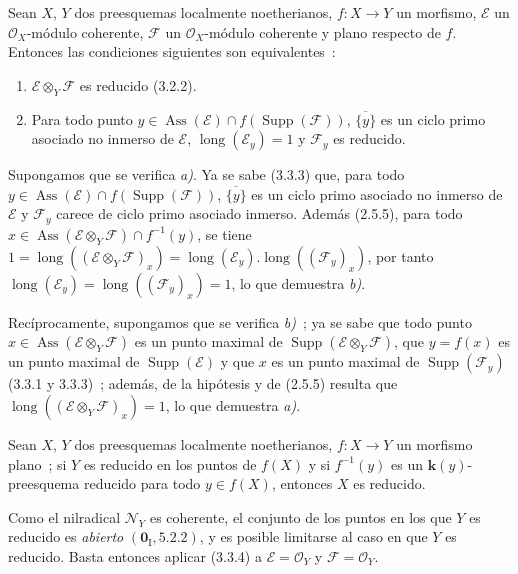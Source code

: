 \begin{proposition}[3.3.4]
\label{IV.2.3.3.4-fr}
Sean $X$, $Y$ dos preesquemas localmente noetherianos, $f:X\to Y$ un
morfismo, $\mathcal E$ un $\mathcal O_X$-módulo coherente, $\mathcal F$ un
$\mathcal O_X$-módulo coherente y plano respecto de $f$. Entonces las
condiciones siguientes son equivalentes~:
\begin{enumerate}
\item[\emph{a)}] $\mathcal E\otimes_Y\mathcal F$ es reducido \textup{(3.2.2)}.
\item[\emph{b)}] Para todo punto
$y\in\operatorname{Ass}(\mathcal E)\cap f(\operatorname{Supp}(\mathcal F))$,
$\overline{\{y\}}$ es un ciclo primo asociado no inmerso de $\mathcal E$,
$\operatorname{long}(\mathcal E_y)=1$ y $\mathcal F_y$ es reducido.
\end{enumerate}
\end{proposition}

Supongamos que se verifica \emph{a)}. Ya se sabe (3.3.3) que, para todo
$y\in\operatorname{Ass}(\mathcal E)\cap f(\operatorname{Supp}(\mathcal F))$,
$\overline{\{y\}}$ es un ciclo primo asociado no inmerso de $\mathcal E$ y
$\mathcal F_y$ carece de ciclo primo asociado inmerso. Además (2.5.5), para
todo $x\in\operatorname{Ass}(\mathcal E\otimes_Y\mathcal F)\cap f^{-1}(y)$,
se tiene
$1=\operatorname{long}((\mathcal E\otimes_Y\mathcal F)_x)
=\operatorname{long}(\mathcal E_y).\operatorname{long}((\mathcal F_y)_x)$,
por tanto $\operatorname{long}(\mathcal E_y)
=\operatorname{long}((\mathcal F_y)_x)=1$, lo que demuestra \emph{b)}.

Recíprocamente, supongamos que se verifica \emph{b)}~; ya se sabe que todo
punto $x\in\operatorname{Ass}(\mathcal E\otimes_Y\mathcal F)$ es un punto
maximal de $\operatorname{Supp}(\mathcal E\otimes_Y\mathcal F)$, que
$y=f(x)$ es un punto maximal de $\operatorname{Supp}(\mathcal E)$ y que $x$
es un punto maximal de $\operatorname{Supp}(\mathcal F_y)$ (3.3.1 y 3.3.3)~;
además, de la hipótesis y de (2.5.5) resulta que
$\operatorname{long}((\mathcal E\otimes_Y\mathcal F)_x)=1$, lo que demuestra
\emph{a)}.

\begin{corollary}[3.3.5]
\label{IV.2.3.3.5-fr}
Sean $X$, $Y$ dos preesquemas localmente noetherianos, $f:X\to Y$ un
morfismo plano~; si $Y$ es reducido en los puntos de $f(X)$ y si $f^{-1}(y)$
es un $\boldsymbol{k}(y)$-preesquema reducido para todo $y\in f(X)$, entonces $X$ es
reducido.
\end{corollary}

Como el nilradical $\mathcal N_Y$ es coherente, el conjunto de los puntos en
los que $Y$ es reducido es \emph{abierto} $(\mathbf{0}_{\mathrm I},5.2.2)$, y es posible
limitarse al caso en que $Y$ es reducido. Basta entonces aplicar (3.3.4) a
$\mathcal E=\mathcal O_Y$ y $\mathcal F=\mathcal O_Y$.
